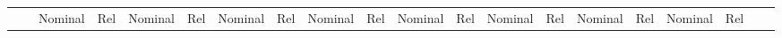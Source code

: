 \begin{table}
\begin{tabular}{llSSSSSSSSSSSSSSSSSS}
		{}                                    & {}            & {Nominal}                                 & {Rel}                                                                                                                                                                                                                                                                                                                                                                                                                    & {Nominal}                         & {Rel}                                                                                                                                                                                                                                                                                                                                                                                                                    & {Nominal}                      & {Rel}                                                                                                                                                                                                                                                                                                                                                                                                                    & {Nominal}                          & {Rel}                                                                                                                                                                                                                                                                                                                                                                                                                    & {Nominal}                                                                                                                        & {Rel}                                                                                                                                                                                                                                                                                                                                                                                                                    & {Nominal}        & {Rel}                                                                                                                                                                                                                                                                                                                                                                                                                    & {Nominal}        & {Rel}                                                                                                                                                                                                                                                                                                                                                                                                                    & {Nominal}        & {Rel}      
\end{tabular}
\end{table}
